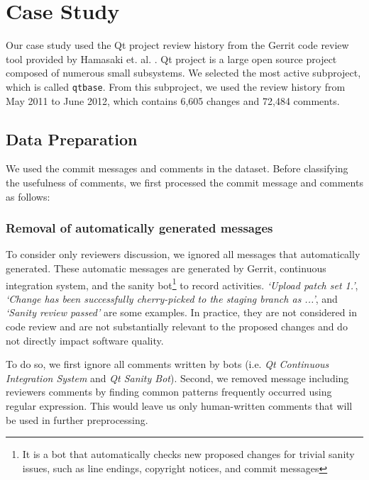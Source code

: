
\section{Case Study}

Our case study used the Qt project review history from the Gerrit code review tool provided by Hamasaki et. al. \cite{Hamasaki2013}. Qt project is a large open source project composed of numerous small subsystems. We selected the most active subproject, which is called \texttt{qtbase}.
From this subproject, we used the review history from May 2011 to June 2012, which contains 6,605 changes and 72,484 comments.


\subsection{Data Preparation}
We used the commit messages and comments in the dataset.
Before classifying the usefulness of comments, we first processed the commit message and comments as follows: 

\subsubsection{Removal of automatically generated messages} To consider only reviewers discussion, we ignored all messages that automatically generated.
These automatic messages are generated by Gerrit, continuous integration system, and the sanity bot\footnote{It is a bot that automatically checks new proposed changes for trivial sanity issues, such as line endings, copyright notices, and commit messages} to record activities. \textit{`Upload patch set 1.'}, \textit{`Change has been successfully cherry-picked to the staging branch as ...'}, and \textit{`Sanity review passed'} are some examples. In practice, they are not considered in code review  and are not substantially relevant to the proposed changes and do not directly impact software quality\cite{Mcintosh}. 

To do so, we first ignore all comments written by bots (i.e. \emph{Qt Continuous Integration System} and \emph{Qt Sanity Bot}). Second, we removed message including reviewers comments by finding common patterns frequently occurred using regular expression. This would leave us only human-written comments that will be used in further preprocessing.

